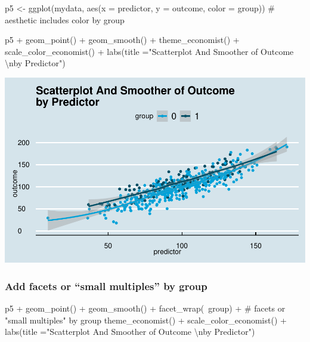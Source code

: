 \documentclass[12pt,]{article}
\newenvironment{Shaded}{}{}
\newcommand{\CharTok}[1]{\textcolor[rgb]{0.00,0.50,0.50}{#1}}
\newcommand{\CommentTok}[1]{\textcolor[rgb]{0.00,0.50,0.00}{#1}}
\newcommand{\DataTypeTok}[1]{#1}
\newcommand{\KeywordTok}[1]{\textcolor[rgb]{0.00,0.00,1.00}{#1}}
\newcommand{\NormalTok}[1]{#1}
\newcommand{\OperatorTok}[1]{#1}
\newcommand{\StringTok}[1]{\textcolor[rgb]{0.00,0.50,0.50}{#1}}
\begin{document}
\begin{Shaded}
\begin{Highlighting}[]
\NormalTok{p5 <-}\StringTok{ }\KeywordTok{ggplot}\NormalTok{(mydata, }
             \KeywordTok{aes}\NormalTok{(}\DataTypeTok{x =}\NormalTok{ predictor, }
                 \DataTypeTok{y =}\NormalTok{ outcome, }
                 \DataTypeTok{color =}\NormalTok{ group)) }\CommentTok{# aesthetic includes color by group}

\NormalTok{p5 }\OperatorTok{+}\StringTok{ }\KeywordTok{geom_point}\NormalTok{() }\OperatorTok{+}\StringTok{ }
\StringTok{  }\KeywordTok{geom_smooth}\NormalTok{() }\OperatorTok{+}\StringTok{ }
\StringTok{  }\KeywordTok{theme_economist}\NormalTok{() }\OperatorTok{+}
\StringTok{  }\KeywordTok{scale_color_economist}\NormalTok{() }\OperatorTok{+}
\StringTok{  }\KeywordTok{labs}\NormalTok{(}\DataTypeTok{title =}\StringTok{"Scatterplot And Smoother of Outcome }\CharTok{\textbackslash{}n}\StringTok{by Predictor"}\NormalTok{)}
\end{Highlighting}
\end{Shaded}

\includegraphics{introduction-to-ggplot2_files/figure-latex/unnamed-chunk-32-1.pdf}

\hypertarget{add-facets-or-small-multiples-by-group}{%
\subsubsection{Add facets or ``small multiples'' by
group}\label{add-facets-or-small-multiples-by-group}}

\begin{Shaded}
\begin{Highlighting}[]
\NormalTok{p5 }\OperatorTok{+}\StringTok{ }
\StringTok{  }\KeywordTok{geom_point}\NormalTok{() }\OperatorTok{+}\StringTok{ }
\StringTok{  }\KeywordTok{geom_smooth}\NormalTok{() }\OperatorTok{+}\StringTok{ }
\StringTok{  }\KeywordTok{facet_wrap}\NormalTok{(}\OperatorTok{~}\NormalTok{group) }\OperatorTok{+}\StringTok{ }\CommentTok{# facets or "small multiples" by group}
\StringTok{  }\KeywordTok{theme_economist}\NormalTok{() }\OperatorTok{+}
\StringTok{  }\KeywordTok{scale_color_economist}\NormalTok{() }\OperatorTok{+}
\StringTok{  }\KeywordTok{labs}\NormalTok{(}\DataTypeTok{title =}\StringTok{"Scatterplot And Smoother of Outcome }\CharTok{\textbackslash{}n}\StringTok{by Predictor"}\NormalTok{)}
\end{Highlighting}
\end{Shaded}
\end{document}
